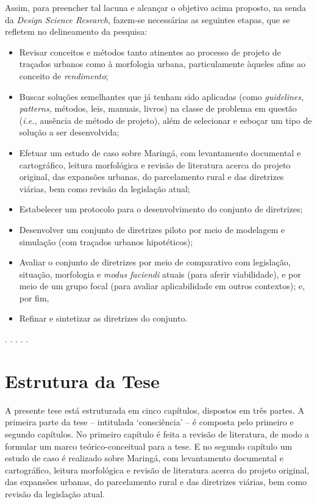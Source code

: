 \documentclass[12pt, a4paper]{book} %
\begin{document}
        Assim, para preencher tal lacuna e alcançar o objetivo acima proposto, na senda da \textit{Design Science Research}, fazem-se necessárias as seguintes etapas, que se refletem no delineamento da pesquisa: 
            \begin{itemize}
                \item Revisar conceitos e métodos tanto atinentes ao processo de projeto de traçados urbanos como à morfologia urbana, particulamente àqueles afins ao conceito de \textit{rendimento}; 
                \item Buscar soluções semelhantes que já tenham sido aplicadas (como \textit{guidelines, patterns,} métodos, leis, manuais, livros) na classe de problema em questão (\textit{i.e.,} ausência de método de projeto), além de selecionar e esboçar um tipo de solução a ser desenvolvida;
                \item Efetuar um estudo de caso sobre Maringá, com levantamento documental e cartográfico, leitura morfológica e revisão de literatura acerca do projeto original, das expansões urbanas, do parcelamento rural e das diretrizes viárias, bem como revisão da legislação atual; %
                \item Estabelecer um protocolo para o desenvolvimento do conjunto de diretrizes; 
                \item Desenvolver um conjunto de diretrizes piloto por meio de modelagem e simulação (com traçados urbanos hipotéticos); 
                \item Avaliar o conjunto de diretrizes por meio de comparativo com legislação, situação, morfologia e \textit{modus faciendi} atuais (para aferir viabilidade), e por meio de um grupo focal (para avaliar aplicabilidade em outros contextos); e, por fim,
                \item Refinar e sintetizar as diretrizes do conjunto.
            \end{itemize}

        \begin{center}
        . . . . .
        \end{center}

            \section*{Estrutura da Tese}

            A presente tese está estruturada em cinco capítulos, dispostos em três partes. A primeira parte da tese – intitulada `consciência' – é composta pelo primeiro e segundo capítulos. No primeiro capítulo é feita a revisão de literatura, de modo a formular um marco teórico-conceitual para a tese. E no segundo capítulo um estudo de caso é realizado sobre Maringá, com levantamento documental e cartográfico, leitura morfológica e revisão de literatura acerca do projeto original, das expansões urbanas, do parcelamento rural e das diretrizes viárias, bem como revisão da legislação atual.
\end{document}
